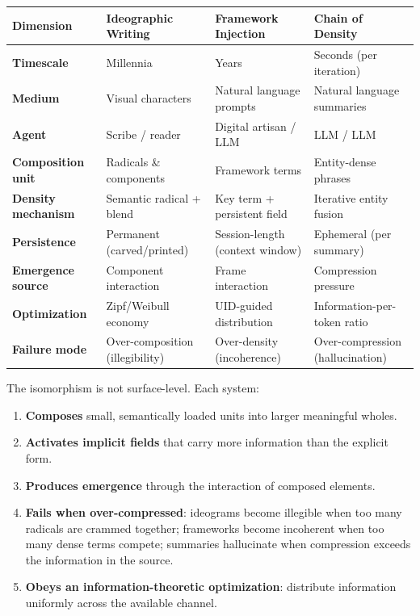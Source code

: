 \documentclass[12pt,a4paper]{article}
\begin{document}
\begin{center}
\begin{tabular}{p{3cm}p{3.5cm}p{3.5cm}p{3.5cm}}
\toprule
\textbf{Dimension} & \textbf{Ideographic Writing} & \textbf{Framework Injection} & \textbf{Chain of Density} \\
\midrule
\textbf{Timescale} & Millennia & Years & Seconds (per iteration) \\
\textbf{Medium} & Visual characters & Natural language prompts & Natural language summaries \\
\textbf{Agent} & Scribe / reader & Digital artisan / LLM & LLM / LLM \\
\textbf{Composition unit} & Radicals \& components & Framework terms & Entity-dense phrases \\
\textbf{Density mechanism} & Semantic radical + blend & Key term + persistent field & Iterative entity fusion \\
\textbf{Persistence} & Permanent (carved/printed) & Session-length (context window) & Ephemeral (per summary) \\
\textbf{Emergence source} & Component interaction & Frame interaction & Compression pressure \\
\textbf{Optimization} & Zipf/Weibull economy & UID-guided distribution & Information-per-token ratio \\
\textbf{Failure mode} & Over-composition (illegibility) & Over-density (incoherence) & Over-compression (hallucination) \\
\bottomrule
\end{tabular}
\end{center}

The isomorphism is not surface-level.
Each system:

\begin{enumerate}
  \item \textbf{Composes} small, semantically loaded units into larger meaningful wholes.
  \item \textbf{Activates implicit fields} that carry more information than the explicit form.
  \item \textbf{Produces emergence} through the interaction of composed elements.
  \item \textbf{Fails when over-compressed}: ideograms become illegible when too many radicals are crammed together; frameworks become incoherent when too many dense terms compete; summaries hallucinate when compression exceeds the information in the source.
  \item \textbf{Obeys an information-theoretic optimization}: distribute information uniformly across the available channel.
\end{enumerate}
\end{document}

